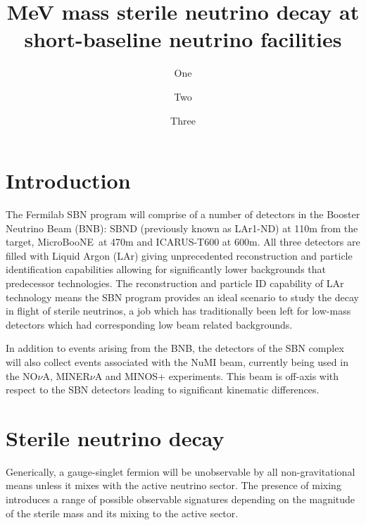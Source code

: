 \documentclass[11pt, a4paper]{article}
\title{MeV mass sterile neutrino decay at short-baseline neutrino facilities}
\author{One}
\author{Two}
\author{Three}
\affiliation{Institute for Particle Physics Phenomenology, Department of
Physics, Durham University, South Road, Durham DH1 3LE, United Kingdom}
\def\muboone{MicroBooNE}
\begin{document}
 

\maketitle

\section{Introduction}

The Fermilab SBN program \cite{Antonello:2015lea} will comprise of a number of
detectors in the Booster Neutrino Beam (BNB): SBND (previously known as
LAr1-ND) at 110m from the target, \muboone\ at 470m and ICARUS-T600 at 600m.
All three detectors are filled with Liquid Argon (LAr) giving unprecedented
reconstruction and particle identification capabilities allowing for
significantly lower backgrounds that predecessor technologies. The
reconstruction and particle ID capability of LAr technology means the SBN
program provides an ideal scenario to study the decay in flight of sterile
neutrinos, a job which has traditionally been left for low-mass detectors which
had corresponding low beam related backgrounds. 

In addition to events arising from the BNB, the detectors of the SBN complex
will also collect events associated with the NuMI beam, currently being used in
the NO$\nu$A, MINER$\nu$A and MINOS+ experiments. This beam is off-axis with
respect to the SBN detectors leading to significant kinematic differences.

\section{Sterile neutrino decay}

Generically, a gauge-singlet fermion will be unobservable by all
non-gravitational means unless it mixes with the active neutrino sector. The
presence of mixing introduces a range of possible observable signatures
depending on the magnitude of the sterile mass and its mixing to the active
sector. 
\end{document}
